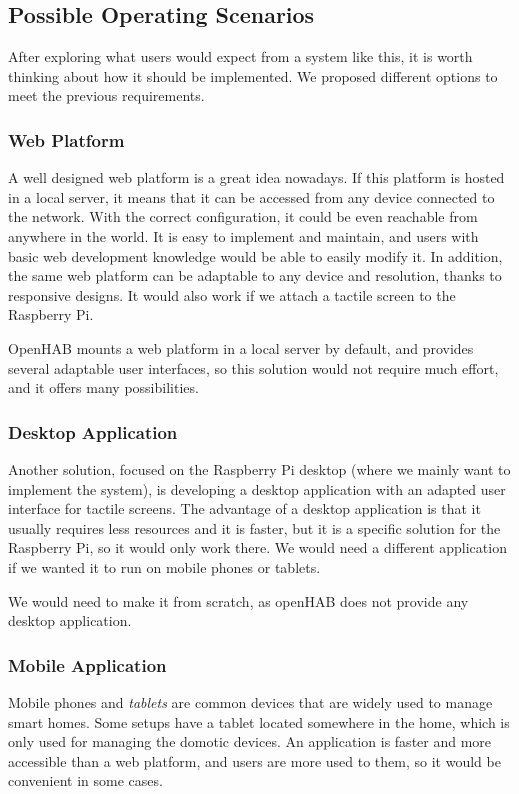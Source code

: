 \subsection{Possible Operating Scenarios}
After exploring what users would expect from a system like this, it is worth thinking about how it should be implemented. We proposed
different options to meet the previous requirements.

\subsubsection{Web Platform}
A well designed web platform is a great idea nowadays. If this platform is hosted in a local server, it means that it can be accessed
from any device connected to the network. With the correct configuration, it could be even reachable from anywhere in the world.
It is easy to implement and maintain, and users with basic web development knowledge would be able to easily modify it. In addition,
the same web platform can be adaptable to any device and resolution, thanks to responsive designs. It would also work if we attach
a tactile screen to the Raspberry Pi.

OpenHAB mounts a web platform in a local server by default, and provides several adaptable user interfaces, so this solution would
not require much effort, and it offers many possibilities.

\subsubsection{Desktop Application}
Another solution, focused on the Raspberry Pi desktop (where we mainly want to implement the system), is developing a desktop
application with an adapted user interface for tactile screens. The advantage of a desktop application is that it usually requires
less resources and it is faster, but it is a specific solution for the Raspberry Pi, so it would only work there. We would need a
different application if we wanted it to run on mobile phones or tablets.

We would need to make it from scratch, as openHAB does not provide any desktop application.

\subsubsection{Mobile Application}
Mobile phones and \textit{tablets} are common devices that are widely used to manage smart homes. Some setups have a tablet located
somewhere in the home, which is only used for managing the domotic devices. An application is faster and more accessible than a web
platform, and users are more used to them, so it would be convenient in some cases.

